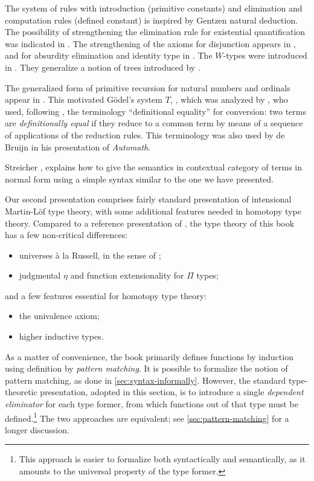 \sectionNotes\label{subsec:general-remarks}


The system of rules with introduction (primitive constants) and elimination
and computation rules (defined constant) is inspired by Gentzen natural
deduction. The possibility of strengthening the elimination rule for
existential quantification was indicated in \cite{howard:pat}. The
strengthening of the axioms for disjunction appears in \cite{Martin-Lof-1972},
and for absurdity elimination and identity type in \cite{Martin-Lof-1973}. The
$W$-types were introduced in \cite{Martin-Lof-1979}. They generalize a notion
of trees introduced by \cite{Tait-1968}.

The generalized form of primitive recursion for natural numbers and ordinals
appear in \cite{Hilbert-1925}.  This motivated G\"odel's system $T$,
\cite{Goedel-T-1958}, which was analyzed by \cite{Tait-1966}, who used,
following \cite{Goedel-1958}, the terminology ``definitional equality'' for
conversion: two terms are {\em definitionally equal} if they reduce to a
common term by means of a sequence of applications of the reduction
rules. This terminology was also used by de Bruijn \cite{deBruijn-1973} in his
presentation of {\em Automath}.

Streicher \cite[Theorem 4.13]{Streicher-1991}, explains how to give the
semantics in contextual category of terms in normal form using a simple syntax
similar to the one we have presented.

Our second presentation comprises fairly standard presentation of
intensional Martin-L\"{o}f type theory, with some additional features needed in
homotopy type theory. Compared to a reference presentation of
\cite{hofmann:syntax-and-semantics}, the type theory of this book has a few
non-critical differences:
%
\begin{itemize}
\item universes \`{a} la Russell, in the sense of
\cite{martin-lof:bibliopolis};
\item judgmental $\eta$ and function extensionality for $\Pi$ types;
\end{itemize}
and a few features essential for homotopy type theory:
\begin{itemize}
\item the univalence axiom;
\item higher inductive types.
\end{itemize}
%
As a matter of convenience, the book primarily defines functions by induction
using definition by \emph{pattern matching}. It is possible to formalize the
notion of pattern matching, as done in \autoref{sec:syntax-informally}. However, the
standard type-theoretic presentation, adopted in this section, is to introduce a single \emph{dependent
eliminator} for each type former, from which functions out of that type must be
defined.\footnote{This approach is easier to formalize both syntactically and
semantically, as it amounts to the universal property of the type former.}
The two approaches are equivalent; see \autoref{sec:pattern-matching} for a
longer discussion.




